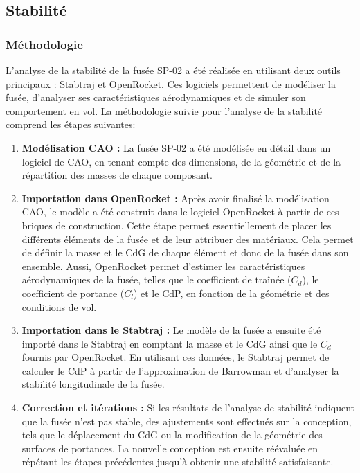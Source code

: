 \subsection{Stabilité}
\label{subsec:stabilite}

\subsubsection{Méthodologie}
\label{subsubsec:stabilite_methode}

L'analyse de la stabilité de la fusée SP-02 a été réalisée en utilisant deux outils principaux : \gls{Stabtraj} et
\gls{OpenRocket}. Ces logiciels permettent de modéliser la fusée, d'analyser ses caractéristiques aérodynamiques et de simuler
son comportement en vol. La méthodologie suivie pour l'analyse de la stabilité comprend les étapes suivantes:\\

\begin{enumerate}
    \item \textbf{Modélisation \acrshort{CAO} :} La fusée SP-02 a été modélisée en détail dans un logiciel de \acrshort{CAO}, en
    tenant compte des dimensions, de la géométrie et de la répartition des masses de chaque composant.\\
    
    \item \textbf{Importation dans \gls{OpenRocket} :} Après avoir finalisé la modélisation \acrshort{CAO}, le modèle a été
    construit dans le logiciel \gls{OpenRocket} à partir de ces briques de construction. Cette étape permet essentiellement de
    placer les différents éléments de la fusée et de leur attribuer des matériaux. Cela permet de définir la masse et le
    \acrfull{CdG} de chaque élément et donc de la fusée dans son ensemble. Aussi, \gls{OpenRocket} permet d'estimer les
    caractéristiques aérodynamiques de la fusée, telles que le coefficient de traînée ($C_d$), le coefficient de portance ($C_l$)
    et le \acrfull{CdP}, en fonction de la géométrie et des conditions de vol.\\

    \item \textbf{Importation dans le \gls{Stabtraj} :} Le modèle de la fusée a ensuite été importé dans le \gls{Stabtraj} en comptant
    la masse et le \acrshort{CdG} ainsi que le $C_d$ fournis par \gls{OpenRocket}. En utilisant ces données, le \gls{Stabtraj}
    permet de calculer le \acrshort{CdP} à partir de l'approximation de Barrowman \cite{Stab_doc} et d'analyser la stabilité
    longitudinale de la fusée.\\

    \item \textbf{Correction et itérations :} Si les résultats de l'analyse de stabilité indiquent que la fusée n'est pas stable,
    des ajustements sont effectués sur la conception, tels que le déplacement du \acrshort{CdG} ou la modification de la géométrie
    des surfaces de portances. La nouvelle conception est ensuite réévaluée en répétant les étapes précédentes jusqu'à obtenir
    une stabilité satisfaisante.\\
\end{enumerate}

